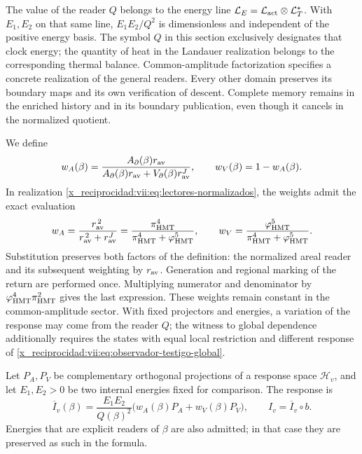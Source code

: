 The value of the reader \(Q\) belongs to the energy line
\(\mathcal L_E=\mathcal L_{\rm act}\otimes\mathcal L_T^*\).
With \(E_1,E_2\) on that same line,
\(E_1E_2/Q^2\) is dimensionless and independent of the positive energy
basis. The symbol \(Q\) in this section exclusively designates
that clock energy; the quantity of heat in the Landauer
realization belongs to the corresponding thermal balance.
Common-amplitude factorization specifies a concrete
realization of the general readers. Every other domain preserves its
boundary maps and its own verification of descent.
Complete memory remains in the enriched history and in its
boundary publication, even though it cancels in the normalized quotient.


We define
\[
 w_A(\beta)=
 \frac{A_\partial(\beta)r_{\rm av}}
 {A_\partial(\beta)r_{\rm av}+V_\partial(\beta)r_{\rm av}^{J}},
 \qquad w_V(\beta)=1-w_A(\beta).
\]
In realization \eqref{x_reciprocidad:vii:eq:lectores-normalizados}, the weights
admit the exact evaluation
\begin{equation}
 w_A=\frac{r_{\rm av}^{\,2}}{r_{\rm av}^{\,2}+r_{\rm av}^{J}}
     =\frac{\pi_{\rm HMT}^{4}}
            {\pi_{\rm HMT}^{4}+\varphi_{\rm HMT}^{5}},\qquad
 w_V=\frac{\varphi_{\rm HMT}^{5}}
            {\pi_{\rm HMT}^{4}+\varphi_{\rm HMT}^{5}}.
 \label{x_reciprocidad:vii:eq:pesos-amplitud-comun}
\end{equation}
Substitution preserves both factors of the definition: the normalized
areal reader and its subsequent weighting by \(r_{\rm av}\).
Generation and regional marking of the return are performed once.
Multiplying numerator
and denominator by \(\varphi_{\rm HMT}^4\pi_{\rm HMT}^2\)
gives the last expression. These weights remain constant in the
common-amplitude sector. With fixed projectors and energies, a
variation of the response may come from the reader \(Q\);
the witness to global dependence additionally requires the states with
equal local restriction and different response of
\eqref{x_reciprocidad:vii:eq:observador-testigo-global}.


Let \(P_A,P_V\) be complementary orthogonal projections of a
response space \(\mathcal H_v\), and let \(E_1,E_2>0\) be
two internal energies fixed for comparison. The response is
\begin{equation}
 \overline I_v(\beta)=\frac{E_1E_2}{Q(\beta)^2}
       \bigl(w_A(\beta)P_A+w_V(\beta)P_V\bigr),
 \qquad I_v=\overline I_v\circ b.
 \label{x_reciprocidad:vii:eq:observador-respuesta-ponderada}
\end{equation}
Energies that are explicit readers of
\(\beta\) are also admitted; in that case they are preserved as such in the formula.

